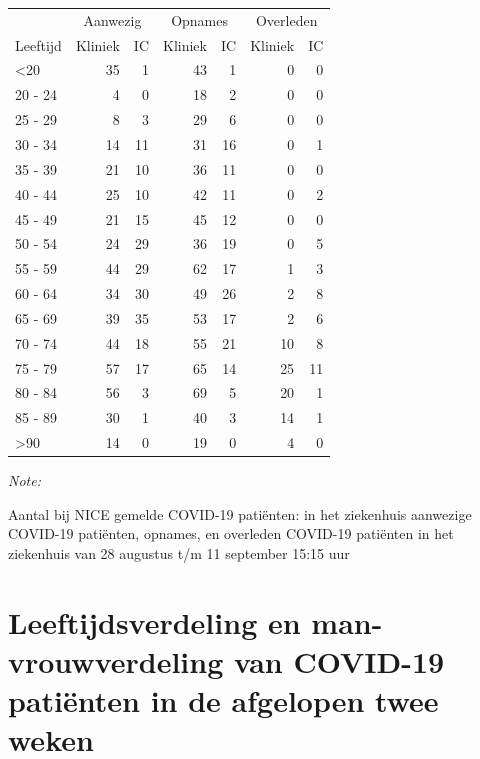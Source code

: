 \documentclass[
  english,
  man,floatsintext]{apa6}
\begin{document}
\begin{table}
\centering\begingroup\fontsize{10}{12}\selectfont

\begin{threeparttable}
\begin{tabular}{lrrrrrr}
\toprule
\multicolumn{1}{c}{ } & \multicolumn{2}{c}{Aanwezig} & \multicolumn{2}{c}{Opnames} & \multicolumn{2}{c}{Overleden} \\
\cmidrule(l{3pt}r{3pt}){2-3} \cmidrule(l{3pt}r{3pt}){4-5} \cmidrule(l{3pt}r{3pt}){6-7}
Leeftijd & Kliniek & IC & Kliniek & IC & Kliniek & IC\\
\midrule
<20 & 35 & 1 & 43 & 1 & 0 & 0\\
20 - 24 & 4 & 0 & 18 & 2 & 0 & 0\\
25 - 29 & 8 & 3 & 29 & 6 & 0 & 0\\
30 - 34 & 14 & 11 & 31 & 16 & 0 & 1\\
35 - 39 & 21 & 10 & 36 & 11 & 0 & 0\\
40 - 44 & 25 & 10 & 42 & 11 & 0 & 2\\
45 - 49 & 21 & 15 & 45 & 12 & 0 & 0\\
50 - 54 & 24 & 29 & 36 & 19 & 0 & 5\\
55 - 59 & 44 & 29 & 62 & 17 & 1 & 3\\
60 - 64 & 34 & 30 & 49 & 26 & 2 & 8\\
65 - 69 & 39 & 35 & 53 & 17 & 2 & 6\\
70 - 74 & 44 & 18 & 55 & 21 & 10 & 8\\
75 - 79 & 57 & 17 & 65 & 14 & 25 & 11\\
80 - 84 & 56 & 3 & 69 & 5 & 20 & 1\\
85 - 89 & 30 & 1 & 40 & 3 & 14 & 1\\
>90 & 14 & 0 & 19 & 0 & 4 & 0\\
\bottomrule
\end{tabular}
\begin{tablenotes}
\item \textit{Note: } 
\item Aantal bij NICE gemelde COVID-19 patiënten: in het ziekenhuis aanwezige COVID-19 patiënten, opnames, en overleden COVID-19 patiënten in het ziekenhuis van 28 augustus t/m 11 september 15:15 uur
\end{tablenotes}
\end{threeparttable}
\endgroup{}
\end{table}

\newpage

\hypertarget{leeftijdsverdeling-en-man-vrouwverdeling-van-covid-19-patiuxebnten-in-de-afgelopen-twee-weken}{%
\section{Leeftijdsverdeling en man-vrouwverdeling van COVID-19 patiënten in de afgelopen twee weken}\label{leeftijdsverdeling-en-man-vrouwverdeling-van-covid-19-patiuxebnten-in-de-afgelopen-twee-weken}}
\end{document}
